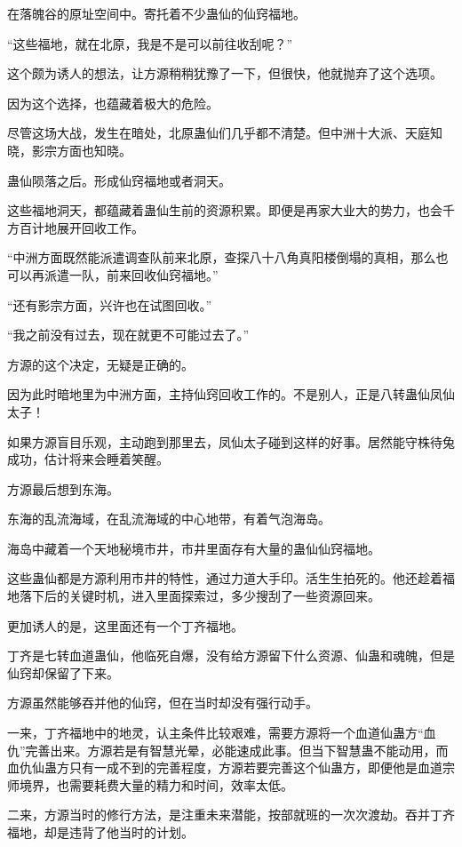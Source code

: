 \begin{this_body}
在落魄谷的原址空间中。寄托着不少蛊仙的仙窍福地。

“这些福地，就在北原，我是不是可以前往收刮呢？”

这个颇为诱人的想法，让方源稍稍犹豫了一下，但很快，他就抛弃了这个选项。

因为这个选择，也蕴藏着极大的危险。

尽管这场大战，发生在暗处，北原蛊仙们几乎都不清楚。但中洲十大派、天庭知晓，影宗方面也知晓。

蛊仙陨落之后。形成仙窍福地或者洞天。

这些福地洞天，都蕴藏着蛊仙生前的资源积累。即便是再家大业大的势力，也会千方百计地展开回收工作。

“中洲方面既然能派遣调查队前来北原，查探八十八角真阳楼倒塌的真相，那么也可以再派遣一队，前来回收仙窍福地。”

“还有影宗方面，兴许也在试图回收。”

“我之前没有过去，现在就更不可能过去了。”

方源的这个决定，无疑是正确的。

因为此时暗地里为中洲方面，主持仙窍回收工作的。不是别人，正是八转蛊仙凤仙太子！

如果方源盲目乐观，主动跑到那里去，凤仙太子碰到这样的好事。居然能守株待兔成功，估计将来会睡着笑醒。

方源最后想到东海。

东海的乱流海域，在乱流海域的中心地带，有着气泡海岛。

海岛中藏着一个天地秘境市井，市井里面存有大量的蛊仙仙窍福地。

这些蛊仙都是方源利用市井的特性，通过力道大手印。活生生拍死的。他还趁着福地落下后的关键时机，进入里面探索过，多少搜刮了一些资源回来。

更加诱人的是，这里面还有一个丁齐福地。

丁齐是七转血道蛊仙，他临死自爆，没有给方源留下什么资源、仙蛊和魂魄，但是仙窍却保留了下来。

方源虽然能够吞并他的仙窍，但在当时却没有强行动手。

一来，丁齐福地中的地灵，认主条件比较艰难，需要方源将一个血道仙蛊方“血仇”完善出来。方源若是有智慧光晕，必能速成此事。但当下智慧蛊不能动用，而血仇仙蛊方只有一成不到的完善程度，方源若要完善这个仙蛊方，即便他是血道宗师境界，也需要耗费大量的精力和时间，效率太低。

二来，方源当时的修行方法，是注重未来潜能，按部就班的一次次渡劫。吞并丁齐福地，却是违背了他当时的计划。


\end{this_body}

